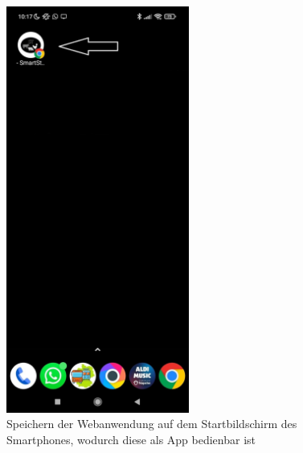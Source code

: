 \documentclass[conference]{IEEEtran}
\begin{document}
\begin{figure}[H]
	\centering
	\includegraphics[width=60mm]{fig/stApp.jpg}
	\caption{Speichern der Webanwendung auf dem Startbildschirm des Smartphones, wodurch diese als App bedienbar ist}
	\label{stApp}
\end{figure}
\end{document}
